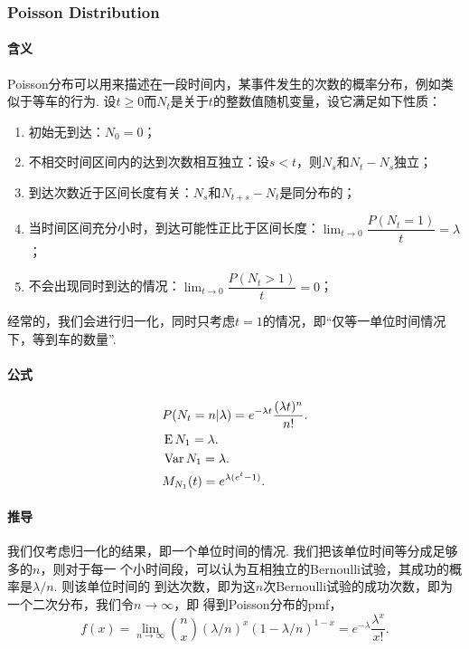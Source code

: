   \subsubsection{Poisson Distribution}
    \paragraph{含义}
    Poisson分布可以用来描述在一段时间内，某事件发生的次数的概率分布，例如类似于等车的行为. 
    设$t\ge 0$而$N_t$是关于$t$的整数值随机变量，设它满足如下性质：
    \begin{enumerate}
      \item 初始无到达：$N_0=0$；
      \item 不相交时间区间内的达到次数相互独立：设$s<t$，则$N_s$和$N_t-N_s$独立；
      \item 到达次数近于区间长度有关：$N_s$和$N_{t+s}-N_t$是同分布的；
      \item 当时间区间充分小时，到达可能性正比于区间长度：$\lim_{t\to 0}
            \dfrac{P(N_t=1)}{t}=\lambda$；
      \item 不会出现同时到达的情况：$\lim_{t\to 0}\dfrac{P(N_t>1)}{t}=0$；
    \end{enumerate}
    经常的，我们会进行归一化，同时只考虑$t=1$的情况，即“仅等一单位时间情况下，等到车的数量”. 
    
    \paragraph{公式}
    \begin{align*}
      & P(N_t=n|\lambda) = e^{-\lambda t}\frac{(\lambda t)^n}{n!}. \\
      & \operatorname{E} N_1 = \lambda. \\
      & \operatorname{Var} N_1 = \lambda. \\
      & M_{N_1}(t) = e^{\lambda(e^t-1)}.
    \end{align*}

    \paragraph{推导}
    我们仅考虑归一化的结果，即一个单位时间的情况. 我们把该单位时间等分成足够多的$n$，则对于每一
    个小时间段，可以认为互相独立的Bernoulli试验，其成功的概率是$\lambda/n$. 则该单位时间的
    到达次数，即为这$n$次Bernoulli试验的成功次数，即为一个二次分布，我们令$n\to\infty$，即
    得到Poisson分布的pmf，
    \[
      f(x) 
      = \lim_{n\to\infty} \binom{n}{x}(\lambda/n)^x (1-\lambda/n)^{1-x}
      = e^{-\lambda}\frac{\lambda^x}{x!}.
    \]

